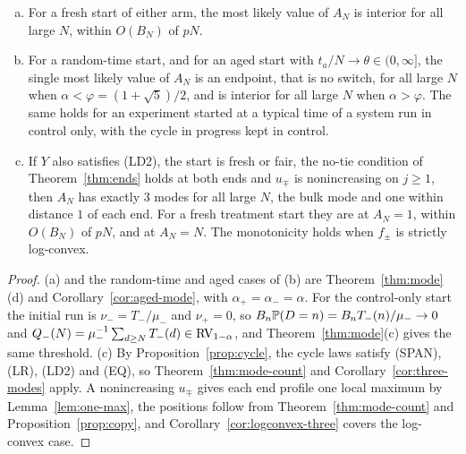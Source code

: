 \begin{corollary}\label{cor:exposure-mode}
\begin{enumerate}[(a)]
\item For a fresh start of either arm, the most likely value of $A_N$ is interior for all
large $N$, within $O(B_N)$ of $pN$.
\item For a random-time start, and for an aged start with $t_a/N\to\theta\in(0,\infty]$, the
single most likely value of $A_N$ is an endpoint, that is no switch, for all large $N$ when
$\alpha<\varphi=(1+\sqrt5)/2$, and is interior for all large $N$ when $\alpha>\varphi$. The
same holds for an experiment started at a typical time of a system run in control only,
with the cycle in progress kept in control.
\item If $Y$ also satisfies (LD2), the start is fresh or fair, the no-tie condition of
Theorem~\ref{thm:ends} holds at both ends and $u_\mp$ is nonincreasing on $j\ge1$, then $A_N$ has
exactly 3 modes for all large $N$, the bulk mode and one within distance $1$ of each end. For a
fresh treatment start they are at $A_N=1$, within $O(B_N)$ of $pN$, and at $A_N=N$. The
monotonicity holds when $f_\pm$ is strictly log-convex.
\end{enumerate}
\end{corollary}

\begin{proof}
(a) and the random-time and aged cases of (b) are Theorem~\ref{thm:mode}(d) and
Corollary~\ref{cor:aged-mode}, with $\alpha_\plus=\alpha_\minus=\alpha$. For the control-only
start the initial run is $\nu_\minus=T_\minus/\mu_\minus$ and $\nu_\plus=0$, so
$B_n\mathbb{P}(D=n)=B_nT_{-}(n)/\mu_{-}\to0$ and $Q_{-}(N)=\mu_{-}^{-1}\sum_{d\ge N}T_{-}(d)\in\mathrm{RV}_{1-\alpha}$,
and Theorem~\ref{thm:mode}(c) gives the same threshold. (c) By
Proposition~\ref{prop:cycle}, the cycle laws satisfy (SPAN), (LR), (LD2) and (EQ), so
Theorem~\ref{thm:mode-count} and Corollary~\ref{cor:three-modes} apply. A nonincreasing
$u_\mp$ gives each end profile one local maximum by Lemma~\ref{lem:one-max}, the positions
follow from Theorem~\ref{thm:mode-count} and Proposition~\ref{prop:copy}, and
Corollary~\ref{cor:logconvex-three} covers the log-convex case.
\end{proof}

